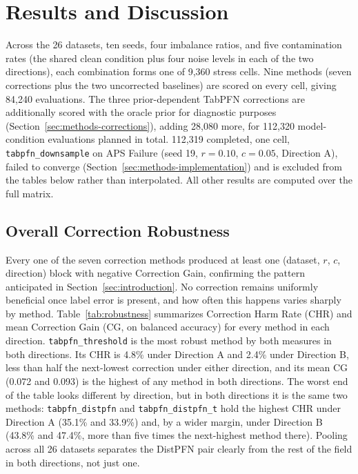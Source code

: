 \section{Results and Discussion}
\label{sec:results}

Across the 26 datasets, ten seeds, four imbalance ratios, and five
contamination rates (the shared clean condition plus four noise levels in
each of the two directions), each combination forms one of 9{,}360 stress
cells. Nine methods (seven corrections plus the two uncorrected baselines)
are scored on every cell, giving 84{,}240 evaluations. The three
prior-dependent TabPFN corrections are additionally scored with the oracle
prior for diagnostic purposes (Section~\ref{sec:methods-corrections}),
adding 28{,}080 more, for 112{,}320 model-condition evaluations planned in
total. 112{,}319 completed, one cell,
\texttt{tabpfn\_downsample} on APS Failure (seed 19, $r{=}0.10$,
$c{=}0.05$, Direction A), failed to converge
(Section~\ref{sec:methods-implementation}) and is excluded from the
tables below rather than interpolated. All other results are computed
over the full matrix.

\subsection{Overall Correction Robustness}
\label{sec:results-rq1}

Every one of the seven correction methods produced at least one
(dataset, $r$, $c$, direction) block with negative Correction Gain,
confirming the pattern anticipated in
Section~\ref{sec:introduction}. No correction remains uniformly beneficial
once label error is present, and how often this happens varies sharply
by method. Table~\ref{tab:robustness} summarizes Correction Harm Rate (CHR) and
mean Correction Gain (CG, on balanced accuracy) for every method in each
direction. \texttt{tabpfn\_threshold} is the most robust method by both
measures in both directions. Its CHR is 4.8\% under Direction A and 2.4\%
under Direction B, less than half the next-lowest correction under either
direction, and its mean CG (0.072 and 0.093) is the highest of any method
in both directions. The worst end of the table looks different by
direction, but in both directions it is the same two methods:
\texttt{tabpfn\_distpfn} and \texttt{tabpfn\_distpfn\_t} hold the highest
CHR under Direction A (35.1\% and 33.9\%) and, by a wider margin, under
Direction B (43.8\% and 47.4\%, more than five times the next-highest
method there). Pooling across all 26 datasets separates the DistPFN pair
clearly from the rest of the field in both directions, not just one.

